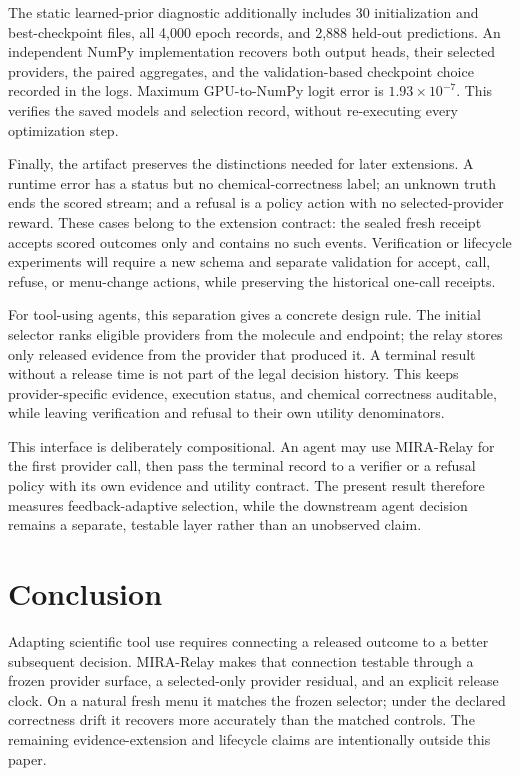\documentclass[sigconf,anonymous]{aamas}
\begin{document}
The static learned-prior diagnostic additionally includes 30 initialization and best-checkpoint files, all 4,000 epoch records, and 2,888 held-out predictions. An independent NumPy implementation recovers both output heads, their selected providers, the paired aggregates, and the validation-based checkpoint choice recorded in the logs. Maximum GPU-to-NumPy logit error is $1.93\times10^{-7}$. This verifies the saved models and selection record, without re-executing every optimization step.

Finally, the artifact preserves the distinctions needed for later extensions. A runtime error has a status but no chemical-correctness label; an unknown truth ends the scored stream; and a refusal is a policy action with no selected-provider reward. These cases belong to the extension contract: the sealed fresh receipt accepts scored outcomes only and contains no such events. Verification or lifecycle experiments will require a new schema and separate validation for accept, call, refuse, or menu-change actions, while preserving the historical one-call receipts.

For tool-using agents, this separation gives a concrete design rule. The initial selector ranks eligible providers from the molecule and endpoint; the relay stores only released evidence from the provider that produced it. A terminal result without a release time is not part of the legal decision history. This keeps provider-specific evidence, execution status, and chemical correctness auditable, while leaving verification and refusal to their own utility denominators.

This interface is deliberately compositional. An agent may use MIRA-Relay for
the first provider call, then pass the terminal record to a verifier or a
refusal policy with its own evidence and utility contract. The present result
therefore measures feedback-adaptive selection, while the downstream agent
decision remains a separate, testable layer rather than an unobserved claim.

\section{Conclusion}
Adapting scientific tool use requires connecting a released outcome to a better subsequent decision. MIRA-Relay makes that connection testable through a frozen provider surface, a selected-only provider residual, and an explicit release clock. On a natural fresh menu it matches the frozen selector; under the declared correctness drift it recovers more accurately than the matched controls. The remaining evidence-extension and lifecycle claims are intentionally outside this paper.

\clearpage
\balance


\end{document}
